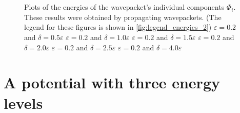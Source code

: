 \begin{figure}
{  } \\
   \\
  \caption[Plots of the energies of the wavepacket's individual components $\Phi_i$.]{
    Plots of the energies of the wavepacket's individual components $\Phi_i$. These
    results were obtained by propagating wavepackets. (The legend for these figures
    is shown in \ref{fig:legend_energies_2})
     $\varepsilon = 0.2$ and $\delta = 0.5 \varepsilon$
     $\varepsilon = 0.2$ and $\delta = 1.0 \varepsilon$
     $\varepsilon = 0.2$ and $\delta = 1.5 \varepsilon$
     $\varepsilon = 0.2$ and $\delta = 2.0 \varepsilon$
     $\varepsilon = 0.2$ and $\delta = 2.5 \varepsilon$
     $\varepsilon = 0.2$ and $\delta = 4.0 \varepsilon$
    \label{fig:two_crossings_energies_h}
  }
\end{figure}


\section{A potential with three energy levels}

